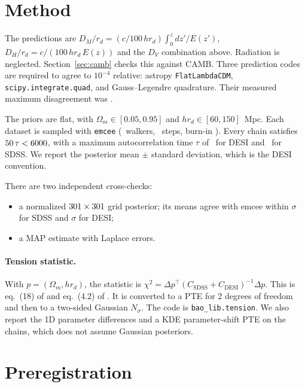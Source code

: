 \documentclass[11pt]{article}
\begin{document}
\section{Method}

The predictions are $D_M/r_d=(c/100\,h r_d)\int_0^z dz'/E(z')$,
$D_H/r_d=c/(100\,h r_d\,E(z))$ and the $D_V$ combination above. Radiation is
neglected. Section~\ref{sec:camb} checks this against CAMB. Three prediction
codes are required to agree to $10^{-4}$ relative: astropy
\texttt{FlatLambdaCDM}, \texttt{scipy.integrate.quad}, and Gauss--Legendre
quadrature. Their measured maximum disagreement was \IcPred.

The priors are flat, with $\Omega_m\in[0.05,0.95]$ and
$h r_d\in[60,150]$~Mpc. Each dataset is sampled with \texttt{emcee}
(\Nwalk\ walkers, \Nstep\ steps, burn-in \Nburn). Every chain satisfies
$50\,\tau<6000$, with a maximum autocorrelation time $\tau$ of
\DesiTauMax\ for DESI and \SdssTauMax\ for SDSS. We report the posterior
mean $\pm$ standard deviation, which is the DESI convention.

There are two independent cross-checks:
\begin{itemize}
\item a normalized $301\times301$ grid posterior; its means agree with
  emcee within \SdssEmGridDiff$\sigma$ for SDSS and \DesiEmGridDiff$\sigma$
  for DESI;
\item a MAP estimate with Laplace errors.
\end{itemize}

\paragraph{Tension statistic.} With $p=(\Omega_m, h r_d)$, the statistic is
$\chi^2=\Delta p^\top(C_\mathrm{SDSS}+C_\mathrm{DESI})^{-1}\Delta p$. This is
eq.~(18) of \cite{desi2025dr2} and eq.~(4.2) of \cite{desi2024vi}. It is
converted to a PTE for 2 degrees of freedom and then to a two-sided Gaussian
$N_\sigma$. The code is \texttt{bao\_lib.tension}. We also report the 1D
parameter differences and a KDE parameter-shift PTE on the chains, which
does not assume Gaussian posteriors.

\section{Preregistration}
\end{document}
